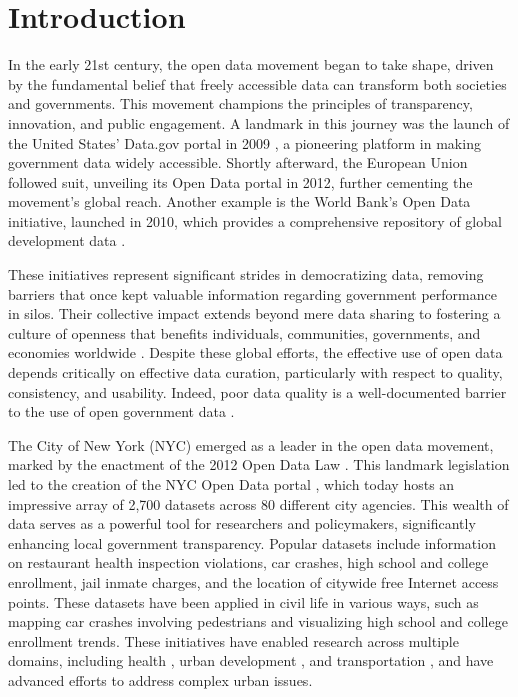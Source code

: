 \documentclass[linenumber]{jdsart}
\begin{document}
\section{Introduction} 
\label{sec:intro}

In the early 21st century, the open data movement began 
to take shape, driven by the fundamental belief that 
freely accessible data can transform both societies and 
governments. This movement champions the principles
of transparency, innovation, and public engagement. 
A landmark in this journey was the launch of the United States'
Data.gov portal in 2009 \citep{dataGov}, a pioneering
platform in making government data widely accessible. Shortly afterward,
the European Union followed suit, unveiling its Open Data portal 
\citep{dataEU} in 2012, further cementing the movement's 
global reach. Another example is the World Bank's Open 
Data initiative, launched in 2010, which provides a comprehensive 
repository of global development data \citep{dataWorldBank}.

 
These initiatives represent significant strides in democratizing data, 
removing barriers that once kept valuable information 
regarding government performance in silos. Their collective impact 
extends beyond mere data sharing to fostering a culture of openness 
that benefits individuals, communities, governments, and economies worldwide 
\citep{barns2016mine, wang2016adoption}.
Despite these global efforts, the effective use of open data depends
critically on effective data curation, particularly with respect to
quality, consistency, and usability. Indeed, poor data quality is a
well-documented barrier to the use of open government data
\citep{janssen2012benefits}.


The City of New York (NYC) emerged as a leader in the open data movement,
marked by the enactment of the 2012 Open Data Law
\citep{nyc_ll11, zuiderwijk2014open}. This landmark legislation led to the
creation of the NYC Open Data portal \citep{dataNYC}, which 
today hosts an impressive array of 2,700 datasets
across 80 different city agencies. This wealth of data serves as a
powerful tool for researchers and policymakers, significantly
enhancing local government transparency.
Popular datasets include information on
restaurant health inspection violations, car crashes, high school and
college enrollment, jail inmate charges, and the location
of citywide free Internet access points. These datasets have been
applied in civil life in various ways, such as mapping car crashes
involving pedestrians and visualizing high school and college
enrollment trends. These initiatives have enabled research across multiple
domains, including health \citep{cantor2018facets, shankar2021data},
urban development \citep{neves2020impacts}, and transportation
\citep{gerte2019understanding}, and have advanced efforts to address
complex urban issues.
\end{document}
